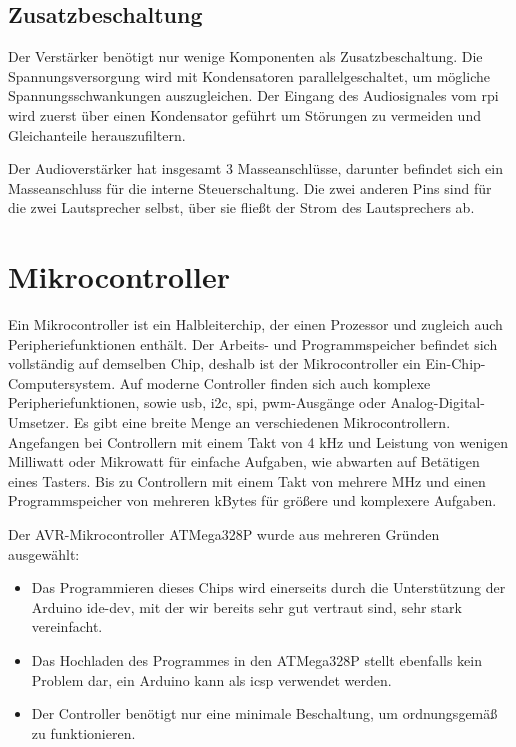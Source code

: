 \subsection{Zusatzbeschaltung}
Der Verstärker benötigt nur wenige Komponenten als Zusatzbeschaltung.
Die Spannungsversorgung wird mit Kondensatoren parallelgeschaltet, um mögliche Spannungsschwankungen auszugleichen.
Der Eingang des Audiosignales vom \ac{rpi} wird zuerst über einen Kondensator geführt um Störungen zu vermeiden und Gleichanteile herauszufiltern.\par

Der Audioverstärker hat insgesamt 3 Masseanschlüsse, darunter befindet sich ein Masseanschluss für die interne Steuerschaltung.
Die zwei anderen Pins sind für die zwei Lautsprecher selbst, über sie fließt der Strom des Lautsprechers ab.

\section{Mikrocontroller}
Ein Mikrocontroller ist ein Halbleiterchip, der einen Prozessor und zugleich auch Peripheriefunktionen enthält.
Der Arbeits- und Programmspeicher befindet sich vollständig auf demselben Chip, deshalb ist der Mikrocontroller ein Ein-Chip-Computersystem.
Auf moderne Controller finden sich auch komplexe Peripheriefunktionen, sowie \ac{usb}, \ac{i2c}, \ac{spi}, \ac{pwm}-Ausgänge oder Analog-Digital-Umsetzer.
Es gibt eine breite Menge an verschiedenen Mikrocontrollern.
Angefangen bei Controllern mit einem Takt von 4 kHz und Leistung von wenigen Milliwatt oder Mikrowatt für einfache Aufgaben, wie abwarten auf Betätigen eines Tasters.
Bis zu Controllern mit einem Takt von mehrere MHz und einen Programmspeicher von mehreren kBytes für größere und komplexere Aufgaben.\par

Der AVR-Mikrocontroller ATMega328P wurde aus mehreren Gründen ausgewählt:
\begin{itemize}
	\item Das Programmieren dieses Chips wird einerseits durch die Unterstützung der Arduino \ac{ide-dev}, mit der wir bereits sehr gut vertraut sind, sehr stark vereinfacht.
	\item Das Hochladen des Programmes in den ATMega328P stellt ebenfalls kein Problem dar, ein Arduino kann als \ac{icsp} verwendet werden.
	\item Der Controller benötigt nur eine minimale Beschaltung, um ordnungsgemäß zu funktionieren.
\end{itemize}


